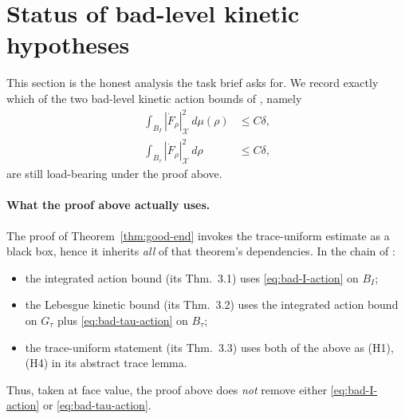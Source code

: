 \documentclass[11pt]{article}
\theoremstyle{definition}
\newcommand{\X}{\mathcal X}
\begin{document}
\section{Status of bad-level kinetic hypotheses}\label{sec:bad-status}

This section is the honest analysis the task brief asks for.  We
record exactly which of the two bad-level kinetic action bounds of
\cite[Hyp.~3.6]{WeightedMetricTrace}, namely
\begin{align}
   \int_{B_I}|\dot F_\rho|_\X^2\,d\mu(\rho)
      &\le C\delta,\tag{$K_I$}\label{eq:bad-I-action}\\
   \int_{B_\tau}|\dot F_\rho|_\X^2\,d\rho
      &\le C\delta,\tag{$K_\tau$}\label{eq:bad-tau-action}
\end{align}
are still load-bearing under the proof above.

\paragraph{What the proof above actually uses.}
The proof of Theorem~\ref{thm:good-end} invokes the trace-uniform
estimate \cite[Thm.~3.3]{WeightedMetricTrace} as a black box, hence it
inherits \emph{all} of that theorem's dependencies.  In the chain of
\cite{WeightedMetricTrace}:
\begin{itemize}
\item the integrated action bound (its Thm.~3.1) uses
\eqref{eq:bad-I-action} on $B_I$;
\item the Lebesgue kinetic bound (its Thm.~3.2) uses the integrated
action bound on $G_\tau$ plus \eqref{eq:bad-tau-action} on $B_\tau$;
\item the trace-uniform statement (its Thm.~3.3) uses both of the
above as (H1), (H4) in its abstract trace lemma.
\end{itemize}
Thus, taken at face value, the proof above does \emph{not} remove
either \eqref{eq:bad-I-action} or \eqref{eq:bad-tau-action}.
\end{document}
